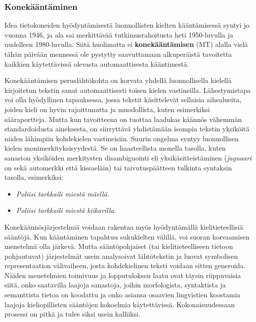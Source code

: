 \begin{multicols}{2}
\subsubsection{Konekääntäminen}

Idea tietokoneiden hyödyntämisestä luonnollisten kielten kääntämisessä syntyi jo vuonna 1946, ja ala sai merkittävää tutkimusrahoitusta heti 1950-luvulla ja uudelleen 1980-luvulla. Siitä huolimatta ei \textbf{konekääntämisen} (MT) alalla vielä tähän päivään mennessä ole pystytty saavuttamaan alkuperäistä tavoitetta kaikkien käytettävissä olevasta automaattisesta kääntimestä.

Konekääntämisen peruslähtökohta on korvata yhdellä luonnollisella kielellä kirjoitetun tekstin sanat automaattisesti toisen kielen vastineilla.  Lähestymistapa voi olla hyödyllinen tapauksessa, jossa tekstit käsittelevät sellaisia aihealueita, joiden kieli on hyvin rajoittunutta ja muodollista, kuten esimerkiksi sääraportteja. Mutta kun tavoitteena on tuottaa laadukas käännös vähemmän standardoidusta aineksesta, on siirryttävä yhdistämään isompia tekstin yksiköitä niiden lähimpiin kohdekielen vastineisiin. Suurin ongelma syntyy luonnollisen kielen monimerkityksisyydestä. Se on haasteellista monella tasolla, kuten sanaston yksiköiden merkitysten disambiguointi eli yksikäsitteistäminen (\textit{jaguaari} on sekä automerkki että kissaeläin) tai taivutuspäätteen tulkinta syntaksin tasolla, esimerkiksi:

\begin{itemize}
\item[] \textit{Poliisi tarkkaili miestä mäellä.}

\item[] \textit{Poliisi tarkkaili miestä kiikarilla.}
\end{itemize}

Konekäännösjärjestelmiä voidaan rakentaa myös hyödyntämällä kielitieteellisiä sääntöjä. Kun kääntäminen tapahtuu sukukielten välillä, voi suoran korvaamisen menetelmä olla järkevä. Mutta sääntöpohjaiset (tai kielitieteelliseen tietoon pohjautuvat) järjestelmät usein analysoivat lähtötekstin ja luovat symbolisen representaation välivaiheen, josta kohdekielinen teksti voidaan sitten generoida. Näiden menetelmien toimivuus ja lopputuloksen laatu ovat täysin riippuvaisia siitä, onko saatavilla laajoja sanastoja, joihin morfologista, syntaktista ja semanttista tietoa on koodattu ja onko asiansa osaavien lingvistien koostamia laajoja kieliopillisten sääntöjen kokoelmia käytettävissä. Kokonaisuudessaan prosessi on pitkä ja tulee siksi usein kalliiksi.


\end{multicols}
